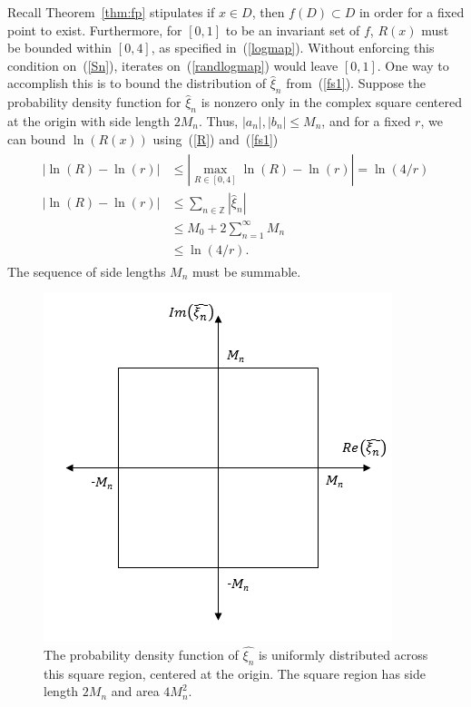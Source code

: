Recall Theorem~\ref{thm:fp} stipulates if $x \in D$, then $f(D) \subset
D$ in order for a fixed point to exist. Furthermore, for $[0,1]$ to be an invariant set of $f$, $R(x)$
must be bounded within $[0,4]$, as specified in~(\ref{logmap}). Without enforcing this condition
on~(\ref{Sn}), iterates on~(\ref{randlogmap}) would leave $[0,1]$. One way to accomplish this is to bound
the distribution of $\hat{\xi}_n$ from~(\ref{fs1}). Suppose the probability density
function for $\hat{\xi}_n$ is nonzero only in the complex square centered at the
origin with side length $2M_n$. Thus, $|a_n|,|b_n| \leq M_n$, and for a fixed $r$, we
can bound $\ln(R(x))$ using~(\ref{R}) and~(\ref{fs1})
\begin{align}
\begin{split}\label{bdnr}
|\ln(R)-\ln(r)|&\leq |\max_{R\in [0,4]}\ln(R) - \ln(r)|=\ln(4/r)\\
|\ln(R)-\ln(r)|&\leq \sum_{n\in \mathbb{Z}}|\hat{\xi}_n| \\
&\leq M_0+2\sum_{n=1}^\infty M_n\\
&\leq \ln(4/r).
\end{split}
\end{align}
The sequence of side lengths $M_n$ must be summable. 
\begin{figure}[!h]
\caption[Uniform Distribution over a Square Region]{The probability
  density function of $\hat{\xi_n}$ is uniformly distributed across
  this square region, centered at the origin. The square region has
  side length $2M_n$ and area $4M_n^2$.}\label{fig:square}
	\begin{center}
		\includegraphics[scale=0.7]{figs/square.png}
	\end{center}
\end{figure}

